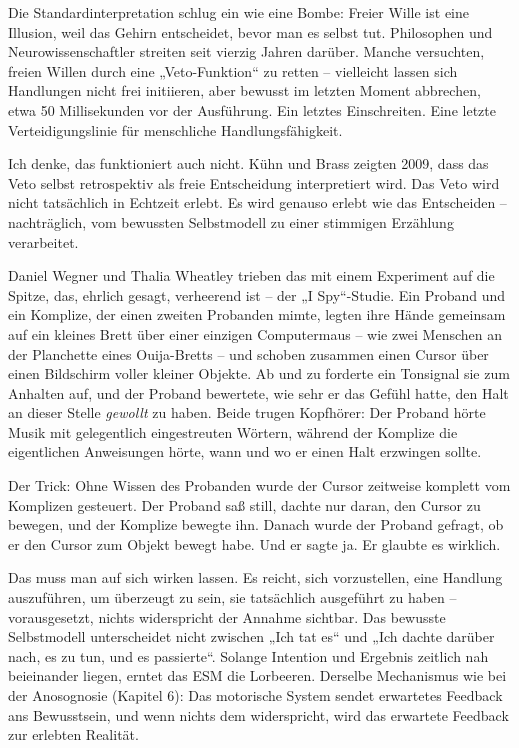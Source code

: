 \documentclass[11pt, twoside, openright]{book}
\begin{document}
Die Standardinterpretation schlug ein wie eine Bombe: Freier Wille ist eine Illusion, weil das Gehirn entscheidet, bevor man es selbst tut. Philosophen und Neurowissenschaftler streiten seit vierzig Jahren darüber. Manche versuchten, freien Willen durch eine „Veto-Funktion“ zu retten -- vielleicht lassen sich Handlungen nicht frei initiieren, aber bewusst im letzten Moment abbrechen, etwa 50 Millisekunden vor der Ausführung. Ein letztes Einschreiten. Eine letzte Verteidigungslinie für menschliche Handlungsfähigkeit.

Ich denke, das funktioniert auch nicht. Kühn und Brass zeigten 2009, dass das Veto selbst retrospektiv als freie Entscheidung interpretiert wird. Das Veto wird nicht tatsächlich in Echtzeit erlebt. Es wird genauso erlebt wie das Entscheiden -- nachträglich, vom bewussten Selbstmodell zu einer stimmigen Erzählung verarbeitet.

Daniel Wegner und Thalia Wheatley trieben das mit einem Experiment auf die Spitze, das, ehrlich gesagt, verheerend ist -- der „I Spy“-Studie. Ein Proband und ein Komplize, der einen zweiten Probanden mimte, legten ihre Hände gemeinsam auf ein kleines Brett über einer einzigen Computermaus -- wie zwei Menschen an der Planchette eines Ouija-Bretts -- und schoben zusammen einen Cursor über einen Bildschirm voller kleiner Objekte. Ab und zu forderte ein Tonsignal sie zum Anhalten auf, und der Proband bewertete, wie sehr er das Gefühl hatte, den Halt an dieser Stelle \textit{gewollt} zu haben. Beide trugen Kopfhörer: Der Proband hörte Musik mit gelegentlich eingestreuten Wörtern, während der Komplize die eigentlichen Anweisungen hörte, wann und wo er einen Halt erzwingen sollte.

Der Trick: Ohne Wissen des Probanden wurde der Cursor zeitweise komplett vom Komplizen gesteuert. Der Proband saß still, dachte nur daran, den Cursor zu bewegen, und der Komplize bewegte ihn. Danach wurde der Proband gefragt, ob er den Cursor zum Objekt bewegt habe. Und er sagte ja. Er glaubte es wirklich.

Das muss man auf sich wirken lassen. Es reicht, sich vorzustellen, eine Handlung auszuführen, um überzeugt zu sein, sie tatsächlich ausgeführt zu haben -- vorausgesetzt, nichts widerspricht der Annahme sichtbar. Das bewusste Selbstmodell unterscheidet nicht zwischen „Ich tat es“ und „Ich dachte darüber nach, es zu tun, und es passierte“. Solange Intention und Ergebnis zeitlich nah beieinander liegen, erntet das ESM die Lorbeeren. Derselbe Mechanismus wie bei der Anosognosie (Kapitel 6): Das motorische System sendet erwartetes Feedback ans Bewusstsein, und wenn nichts dem widerspricht, wird das erwartete Feedback zur erlebten Realität.
\end{document}
